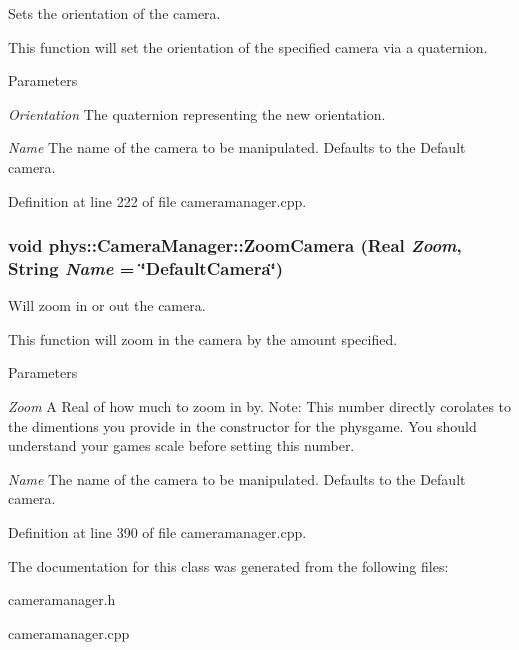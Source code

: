 Sets the orientation of the camera. 

This function will set the orientation of the specified camera via a quaternion. 
\begin{DoxyParams}{Parameters}
\item[{\em Orientation}]The quaternion representing the new orientation. \item[{\em Name}]The name of the camera to be manipulated. Defaults to the Default camera. \end{DoxyParams}


Definition at line 222 of file cameramanager.cpp.

\hypertarget{classphys_1_1CameraManager_aa5a37dbdd45a53bc3dfd4cfa0a94bd42}{
\subsubsection[{ZoomCamera}]{\setlength{\rightskip}{0pt plus 5cm}void phys::CameraManager::ZoomCamera ({\bf Real} {\em Zoom}, \/  {\bf String} {\em Name} = {\ttfamily \char`\"{}DefaultCamera\char`\"{}})}}
\label{d9/d91/classphys_1_1CameraManager_aa5a37dbdd45a53bc3dfd4cfa0a94bd42}


Will zoom in or out the camera. 

This function will zoom in the camera by the amount specified. 
\begin{DoxyParams}{Parameters}
\item[{\em Zoom}]A Real of how much to zoom in by. Note: This number directly corolates to the dimentions you provide in the constructor for the physgame. You should understand your games scale before setting this number. \item[{\em Name}]The name of the camera to be manipulated. Defaults to the Default camera. \end{DoxyParams}


Definition at line 390 of file cameramanager.cpp.



The documentation for this class was generated from the following files:\begin{DoxyCompactItemize}
\item 
cameramanager.h\item 
cameramanager.cpp\end{DoxyCompactItemize}
